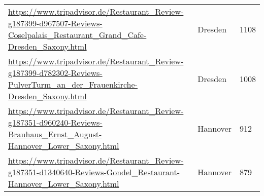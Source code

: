 \begin{table}[]
{\begin{tabular}{lll}
\url{https://www.tripadvisor.de/Restaurant\_Review-g187399-d967507-Reviews-Coselpalais\_Restaurant\_Grand\_Cafe-Dresden\_Saxony.html} & Dresden & 1108 \\ 
\url{https://www.tripadvisor.de/Restaurant\_Review-g187399-d782302-Reviews-PulverTurm\_an\_der\_Frauenkirche-Dresden\_Saxony.html} & Dresden & 1008 \\ 
\url{https://www.tripadvisor.de/Restaurant\_Review-g187351-d960240-Reviews-Brauhaus\_Ernst\_August-Hannover\_Lower\_Saxony.html} & Hannover & 912 \\ 
\url{https://www.tripadvisor.de/Restaurant\_Review-g187351-d1340640-Reviews-Gondel\_Restaurant-Hannover\_Lower\_Saxony.html} & Hannover & 879 \\ 
\hline
\end{tabular}
}
\end{table}